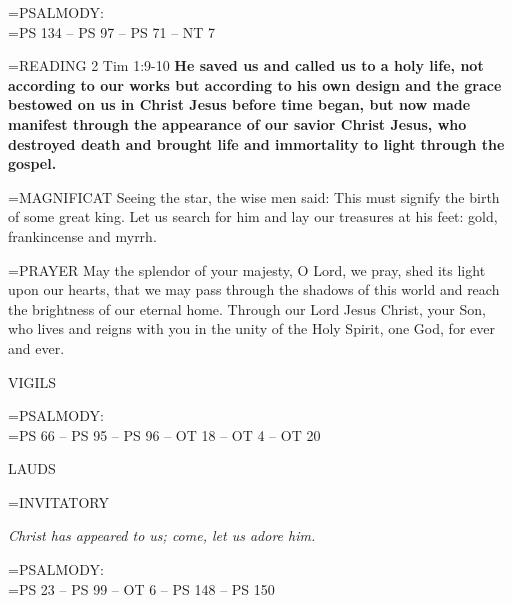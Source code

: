 \hangindent=\parindent \small{PSALMODY:}\\
\hangindent=\parindent  PS 134 -- PS 97 -- PS 71 -- NT 7 \label{epiphany:firstVespers}\vspace{0.5em}


\hangindent=\parindent \small{READING}    2 Tim 1:9-10 \textbf{   He saved us and called us to a holy life, not according to our works but according to his own design and the grace bestowed on us in Christ Jesus before time began, but now made manifest through the appearance of our savior Christ Jesus, who destroyed death and brought life and immortality to light through the gospel.\\}

\hangindent=\parindent \small{MAGNIFICAT 	Seeing the star, the wise men said: This must signify the birth of some great king. Let us search for him and lay our treasures at his feet: gold, frankincense and myrrh.\\}

\hangindent=\parindent \small{PRAYER 	May the splendor of your majesty, O Lord, we pray, shed its light upon our hearts, that we may pass through the shadows of this world and reach the brightness of our eternal home. Through our Lord Jesus Christ, your Son, who lives and reigns with you in the unity of the Holy  Spirit, one God, for ever and ever.}

\begin{flushleft}\normalsize VIGILS\\\end{flushleft}

\hangindent=\parindent \small{PSALMODY:}\\
\hangindent=\parindent  PS 66 -- PS 95 -- PS 96 -- OT 18 -- OT 4 -- OT 20\vspace{0.5em}

\begin{flushleft}\normalsize LAUDS\\\end{flushleft}

\hangindent=\parindent \small{INVITATORY}
\begin{center}
\textit{Christ has appeared to us; come, let us adore him.\\}
\end{center}

\hangindent=\parindent \small{PSALMODY:}\\
\hangindent=\parindent  PS 23 -- PS 99 -- OT 6 -- PS 148 -- PS 150\vspace{0.5em}

